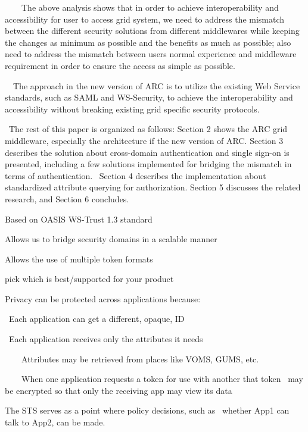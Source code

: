 \documentclass{article}
\begin{document}
\ \ \ \ The above analysis shows that in order to achieve
interoperability and accessibility for user to access grid system, we
need to address the mismatch between the different security solutions
from different middlewares while keeping the changes as minimum as
possible and the benefits as much as possible; also need to address the
mismatch between user{\textquotesingle}s normal experience and
middleware requirement in order to ensure the access as simple as
possible.

\ \ The approach in the new version of ARC is to utilize the existing
Web Service standards, such as SAML and WS-Security, to achieve the
interoperability and accessibility without breaking existing grid
specific security protocols.

\ The rest of this paper is organized as follows: Section 2 shows the
ARC grid middleware, especially the architecture if the new version of
ARC. Section 3 describes the solution about cross-domain authentication
and single sign-on is presented, including a few solutions implemented
for bridging the mismatch in terms of authentication. \ Section 4
describes the implementation about standardized attribute querying for
authorization. Section 5 discusses the related research, and Section 6
concludes.


\bigskip


\bigskip


\bigskip

Based on OASIS WS-Trust 1.3 standard


\bigskip


\bigskip

Allows us to bridge security domains in a scalable manner

Allows the use of multiple token formats

pick which is best/supported for your product

Privacy can be protected across applications because:

\ Each application can get a different, opaque, ID

\ Each application receives only the attributes it needs

\ \ \ \ Attributes may be retrieved from places like VOMS, GUMS, etc.

\ \ \ \ When one application requests a token for use with another that
token \ may be encrypted so that only the receiving app may view its
data 

The STS serves as a point where policy decisions, such as \ whether App1
can talk to App2, can be made.
\end{document}
